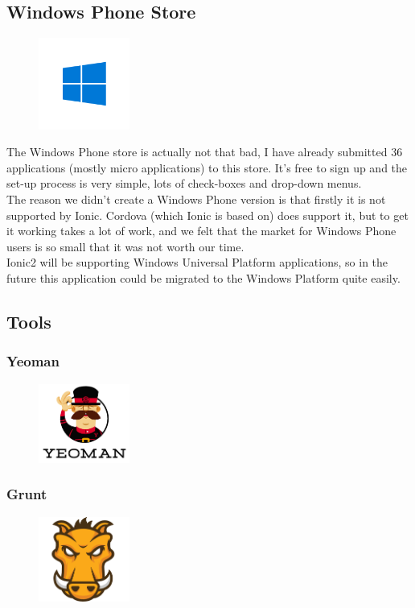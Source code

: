 \subsection{Windows Phone Store}
\begin{figure}
	\includegraphics[width=3cm]{img/mobile-app/logos/windows.png}
\end{figure} 
The Windows Phone store \cite{windows_phone} is actually not that bad, I have already submitted 36 applications (mostly micro applications) to this store.
It's free to sign up and the set-up process is very simple, lots of check-boxes and drop-down menus.
\\
The reason we didn't create a Windows Phone version is that firstly it is not supported by Ionic. Cordova (which Ionic is based on) does support it, but to get it working takes a lot of work, and we felt that the market for Windows Phone users is so small that it was not worth our time.
\\
Ionic2 will be supporting Windows Universal Platform applications, so in the future this application could be migrated to the Windows Platform quite easily.

\subsection{Tools}
\subsubsection{Yeoman}
\begin{figure}
\includegraphics[width=3cm]{img/mobile-app/logos/yeoman.png}
\end{figure}
\cite{jasmine}

\subsubsection{Grunt}
\begin{figure}
\includegraphics[width=3cm]{img/mobile-app/logos/grunt.png}
\end{figure} 
\cite{jasmine}

